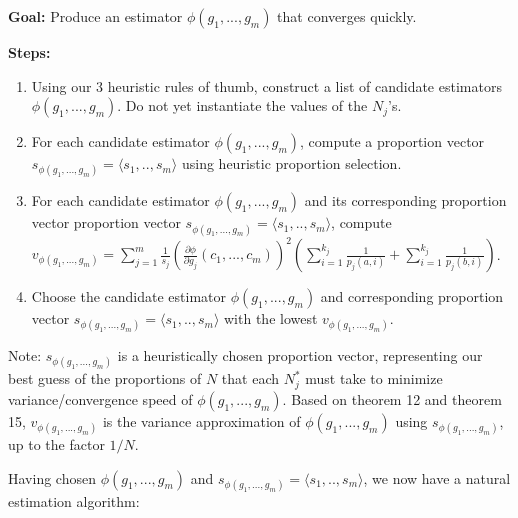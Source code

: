 \documentclass{article}
\begin{document}
\textbf{Goal:} Produce an estimator $\displaystyle \phi \left( g_{1} ,...,g_{m}\right)$ that converges quickly.



\textbf{Steps:}
\begin{enumerate}
\item Using our 3 heuristic rules of thumb, construct a list of candidate estimators $\displaystyle \phi \left( g_{1} ,...,g_{m}\right)$. Do not yet instantiate the values of the $\displaystyle N_{j}$'s.
\item For each candidate estimator $\displaystyle \phi \left( g_{1} ,...,g_{m}\right)$, compute a proportion vector $\displaystyle s_{\phi \left( g_{1} ,...,g_{m}\right)} =\langle s_{1} ,..,s_{m} \rangle $ using heuristic proportion selection.
\item For each candidate estimator $\displaystyle \phi \left( g_{1} ,...,g_{m}\right)$ and its corresponding proportion vector proportion vector $\displaystyle s_{\phi \left( g_{1} ,...,g_{m}\right)} =\langle s_{1} ,..,s_{m} \rangle $, compute $\displaystyle v_{\phi \left( g_{1} ,...,g_{m}\right)} =\sum _{j=1}^{m}\frac{1}{s_{j}}\left(\frac{\partial \phi }{\partial g_{j}}\left( c_{1} ,...,c_{m}\right)\right)^{2}\left(\sum _{i=1}^{k_{j}}\frac{1}{p_{j}\left( a,i\right)} +\sum _{i=1}^{k_{j}}\frac{1}{p_{j}\left( b,i\right)}\right)$.
\item Choose the candidate estimator $\displaystyle \phi \left( g_{1} ,...,g_{m}\right)$ and corresponding proportion vector $\displaystyle s_{\phi \left( g_{1} ,...,g_{m}\right)} =\langle s_{1} ,..,s_{m} \rangle $ with the lowest $\displaystyle v_{\phi \left( g_{1} ,...,g_{m}\right)}$.
\end{enumerate}



Note: $\displaystyle s_{\phi \left( g_{1} ,...,g_{m}\right)}$ is a heuristically chosen proportion vector, representing our best guess of the proportions of $\displaystyle N$ that each $\displaystyle N_{j}^{*}$ must take to minimize variance/convergence speed of $\displaystyle \phi \left( g_{1} ,...,g_{m}\right)$. Based on theorem 12 and theorem 15, $\displaystyle v_{\phi \left( g_{1} ,...,g_{m}\right)}$ is the variance approximation of $\displaystyle \phi \left( g_{1} ,...,g_{m}\right)$ using $\displaystyle s_{\phi \left( g_{1} ,...,g_{m}\right)}$, up to the factor $\displaystyle 1/N$.



Having chosen $\displaystyle \phi \left( g_{1} ,...,g_{m}\right)$ and $\displaystyle s_{\phi \left( g_{1} ,...,g_{m}\right)} =\langle s_{1} ,..,s_{m} \rangle $, we now have a natural estimation algorithm:
\end{document}
